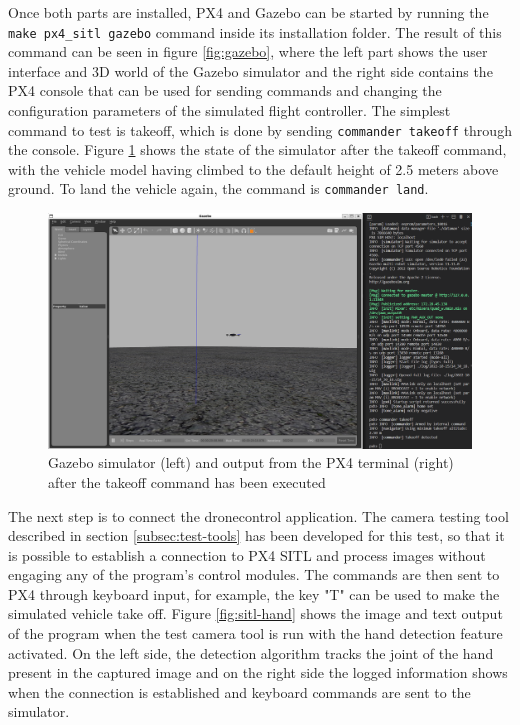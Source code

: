 Once both parts are installed, PX4 and Gazebo can be started by running the \texttt{make px4_sitl gazebo} command inside its installation folder.
The result of this command can be seen in figure \ref{fig:gazebo}, where the left part shows the user interface and 3D world of the Gazebo simulator and the right side contains the PX4 console that can be used for sending commands and changing the configuration parameters of the simulated flight controller.
The simplest command to test is takeoff, which is done by sending \verb|commander takeoff| through the console.
Figure \ref{fig:gazebo-takeoff} shows the state of the simulator after the takeoff command, with the vehicle model having climbed to the default height of 2.5 meters above ground.
To land the vehicle again, the command is \verb|commander land|.

\begin{figure}
  \centering
  \includegraphics[width=.8\textwidth, keepaspectratio]{img/gazebo-takeoff.png}
  \caption{Gazebo simulator (left) and output from the PX4 terminal (right) after the takeoff command has been executed}\label{fig:gazebo-takeoff}
\end{figure}

The next step is to connect the dronecontrol application.
The camera testing tool described in section \ref{subsec:test-tools} has been developed for this test, so that it is possible to establish a connection to PX4 SITL and process images without engaging any of the program's control modules.
The commands are then sent to PX4 through keyboard input, for example, the key "T" can be used to make the simulated vehicle take off.
Figure \ref{fig:sitl-hand} shows the image and text output of the program when the test camera tool is run with the hand detection feature activated.
On the left side, the detection algorithm tracks the joint of the hand present in the captured image and on the right side the logged information shows when the connection is established and keyboard commands are sent to the simulator.

